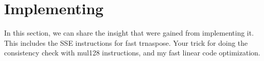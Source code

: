 \section{Implementing}


In this section, we can share the insight that were gained from implementing it. This includes the SSE instructions for fast trnaspose. Your trick for doing the consistency check with mul128 instructions, and my fast linear code optimization.